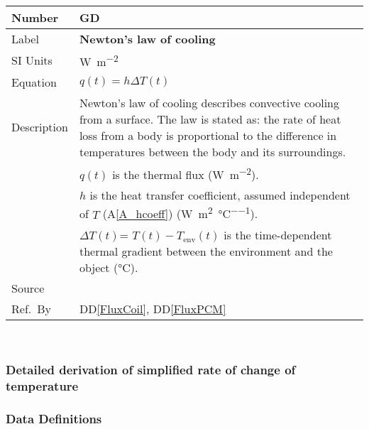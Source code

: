 \documentclass[12pt]{article}
\newcommand{\colAwidth}{0.13\textwidth}
\newcommand{\colBwidth}{0.82\textwidth}
\newcounter{defnum} %
\newcommand{\ddref}[1]{DD\ref{#1}}
\newcommand{\aref}[1]{A\ref{#1}}
\begin{document}
~\newline

\noindent
\begin{minipage}{\textwidth}
	\renewcommand*{\arraystretch}{1.5}
	\begin{tabular}{| p{\colAwidth} | p{\colBwidth}|}
		\hline
		\rowcolor[gray]{0.9}
		Number& GD{defnum}\thedefnum \label{NL}\\
		\hline
		Label &\bf Newton's law of cooling \\
		\hline
		SI Units&\si{\watt\per\square\metre}\\
		\hline
		Equation&$ q(t) = h \Delta T(t)$  \\
		\hline
		Description &
		Newton's law of cooling describes convective cooling from a surface.  The law is
		stated as: the rate of heat loss from a body is proportional to the difference
		in temperatures between the body and its surroundings.
		\\
		& $q(t)$ is the thermal flux (\si{\watt\per\square\metre}).\\
		& $h$ is the heat transfer coefficient, assumed independent of $T$ (\aref{A_hcoeff})
			(\si{\watt\per\square\metre\per\celsius}).\\
		&$\Delta T(t)$= $T(t) - T_{\text{env}}(t)$ is the time-dependent thermal gradient
		between the environment and the object (\si{\celsius}).
		\\
		\hline
		  Source &~\cite[p.\ 8]{Incropera2007}\\
		  \hline
		  Ref.\ By & \ddref{FluxCoil}, \ddref{FluxPCM}\\
		  \hline
	\end{tabular}
\end{minipage}\\

\subsubsection*{Detailed derivation of simplified rate of change of temperature}


\subsubsection{Data Definitions}\label{sec_datadef}
\end{document}
